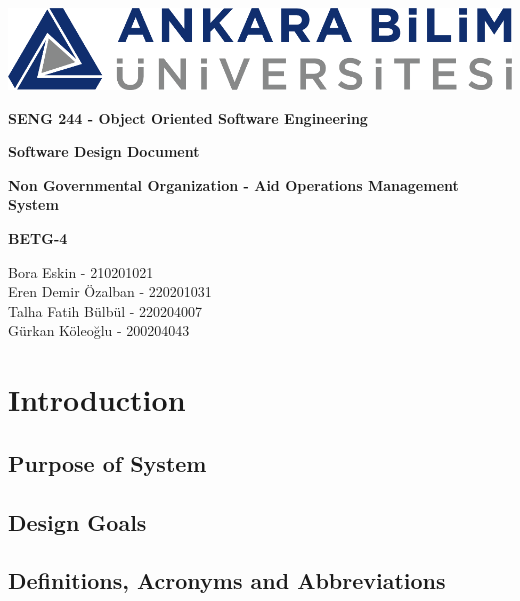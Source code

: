 \documentclass[a4paper,12pt]{report}
\begin{document}
	\begin{titlepage}
		\begin{center}
			\includegraphics{ankara_bilim.png}
		\end{center}
		\vspace{1cm}
		\begin{center}
			\LARGE
			\textbf{SENG 244 - Object Oriented Software Engineering}
		\end{center}
		\vspace{1cm}
		\begin{center}
			\Large
			\textbf{Software Design Document}
		\end{center}
		\vspace{1cm}
		\begin{center}
			\Large
			\textbf{Non Governmental Organization - Aid Operations Management System}
		\end{center}
		\vspace{2cm}
		\begin{center}
			\large
			\textbf{BETG-4}
		\end{center}
		\vspace{1cm}
		\begin{center}
			\large
			Bora Eskin - 210201021\\
			Eren Demir Özalban - 220201031\\
			Talha Fatih Bülbül - 220204007\\
			Gürkan Köleoğlu - 200204043
		\end{center}
	\end{titlepage}
	
	\tableofcontents
	
	\section{Introduction}
		\subsection{Purpose of System}
		\subsection{Design Goals}
		\subsection{Definitions, Acronyms and Abbreviations}
\end{document}
